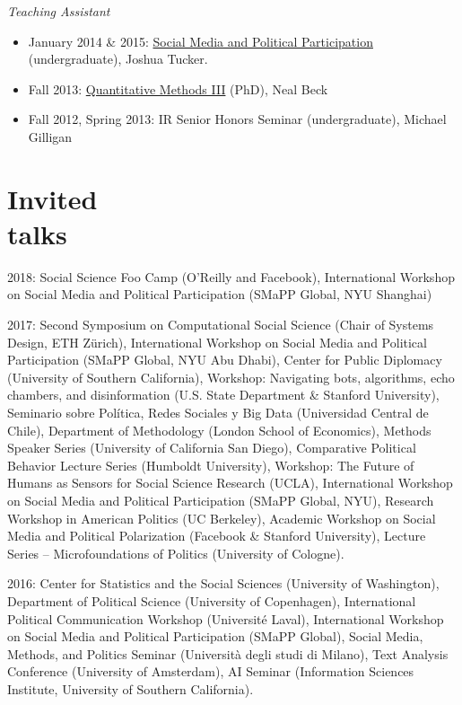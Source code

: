 \documentclass[margin,line,11pt]{resume}
\begin{document}
\begin{resume}
\emph{Teaching Assistant}
\begin{itemize}
\item January 2014 \& 2015: \href{https://github.com/pablobarbera/NYU-AD-160J}{Social Media and Political Participation} (undergraduate), Joshua Tucker.
\item Fall 2013: \href{https://github.com/pablobarbera/quant3materials}{Quantitative Methods III} (PhD), Neal Beck
\item Fall 2012, Spring 2013: IR Senior Honors Seminar (undergraduate), Michael Gilligan
\end{itemize}

    
    \newpage
    
        \section{\mysidestyle Invited\\talks}
2018: Social Science Foo Camp (O'Reilly and Facebook), International Workshop on Social Media and Political Participation (SMaPP Global, NYU Shanghai)
        
2017: Second Symposium on Computational Social Science (Chair of Systems Design, ETH Z\"{u}rich), International Workshop on Social Media and Political Participation (SMaPP Global, NYU Abu Dhabi), Center for Public Diplomacy (University of Southern California), Workshop: Navigating bots, algorithms, echo chambers, and disinformation (U.S. State Department \& Stanford University), Seminario sobre Pol\'{i}tica, Redes Sociales y Big Data (Universidad Central de Chile), Department of Methodology (London School of Economics), Methods Speaker Series (University of California San Diego), Comparative Political Behavior Lecture Series (Humboldt University), Workshop: The Future of Humans as Sensors for Social Science Research (UCLA),  International Workshop on Social Media and Political Participation (SMaPP Global, NYU), Research Workshop in American Politics (UC Berkeley), Academic Workshop on Social Media and Political Polarization (Facebook \& Stanford University),  Lecture Series -- Microfoundations of Politics (University of Cologne).

2016: Center for Statistics and the Social Sciences (University of Washington), Department of Political Science (University of Copenhagen), International Political Communication Workshop (Universit\'{e} Laval), International Workshop on Social Media and Political Participation (SMaPP Global), Social Media, Methods, and Politics Seminar (Universit\`{a} degli studi di Milano), Text Analysis Conference (University of Amsterdam), AI Seminar (Information Sciences Institute, University of Southern California).


\end{resume}
\end{document}
